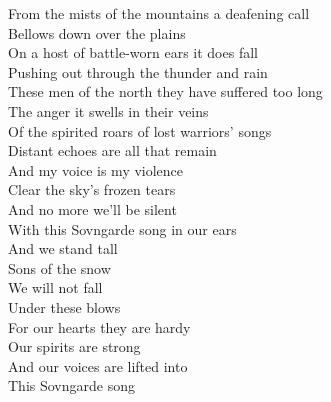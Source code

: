 \begin{flushleft}
From the mists of the mountains a deafening call \\
Bellows down over the plains \tab{}\tab{}\\
On a host of battle-worn ears it does fall \tab{}\\
Pushing out through the thunder and rain \tab{}\\
These men of the north they have suffered too long \\
The anger it swells in their veins \tab{}\\
Of the spirited roars of lost warriors' songs \tab{}\\
Distant echoes are all that remain \tab{}\\
\hops
\hspace{0.9cm}And my voice is my violence \\
\hspace{0.9cm}Clear the sky's frozen tears  \\
\hspace{0.9cm}And no more we'll be silent \\
\hspace{0.9cm}With this Sovngarde song in our ears \\
\hop
\hspace{1.8cm}And we stand tall  \tab{}\\
\hspace{1.8cm}Sons of the snow \tab{}\\
\hspace{1.8cm}We will not fall \tab{}\\
\hspace{1.8cm}Under these blows \tab{}\\
\hspace{1.8cm}For our hearts they are hardy \\
\hspace{1.8cm}Our spirits are strong \\
\hspace{1.8cm}And our voices are lifted into \\
\hspace{1.8cm}This Sovngarde song  \\
\hops
\tab{}\tab{}\\

\end{flushleft}
